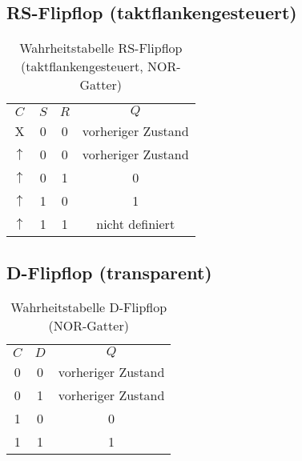 \subsection{RS-Flipflop (taktflankengesteuert)}
\begin{table}[H]
  \begin{center}
    \begin{tabular}{cccc}
      \rowcolor{gray0} 
      $C$ & $S$ & $R$ & $Q$                \\
      X   & 0   & 0   & vorheriger Zustand \\ \hline
      $\uparrow$   & 0   & 0   & vorheriger Zustand \\
      $\uparrow$   & 0   & 1   & 0                  \\
      $\uparrow$   & 1   & 0   & 1                  \\
      $\uparrow$   & 1   & 1   & nicht definiert   
    \end{tabular}
  \end{center}
  \caption{Wahrheitstabelle RS-Flipflop (taktflankengesteuert, NOR-Gatter)}
\end{table}

\subsection{D-Flipflop (transparent)}
\begin{table}[H]
  \begin{center}
    \begin{tabular}{ccc}
      \rowcolor{gray0} 
      $C$ & $D$                       & $Q$                       \\
      0   & 0                         & vorheriger Zustand        \\
      0   & 1                         & vorheriger Zustand        \\
      1   & 0 & 0 \\
      1   & 1 & 1
    \end{tabular}
  \end{center}
  \caption{Wahrheitstabelle D-Flipflop (NOR-Gatter)}
\end{table}


